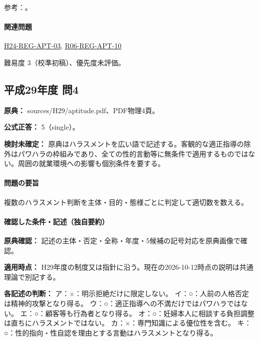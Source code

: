 \par 参考：\cite{employment_power2012,employment_power_current,employment_sexual_current,employment_sexual2018}。

\paragraph{関連問題} \hyperref[q:h24-reg-apt-03]{H24-REG-APT-03}, \hyperref[q:r06-reg-apt-10]{R06-REG-APT-10}

\par 難易度 3（校準初稿）、優先度未評価。

\subsection{平成29年度 問4}
\label{q:h29-reg-apt-04}

\noindent\textbf{原典：} sources/H29/aptitude.pdf、PDF物理4頁。

\textbf{公式正答：} 5（single）。

\par\textbf{検討未確定：} 原典はハラスメントを広い語で記述する。客観的な適正指導の除外はパワハラの枠組みであり、全ての性的言動等に無条件で適用するものではない。周囲の就業環境への影響も個別条件を要する。

\paragraph{問題の要旨} 複数のハラスメント判断を主体・目的・態様ごとに判定して適切数を数える。

\paragraph{確認した条件・記述（独自要約）}\mbox{}\par

\noindent\textbf{原典確認：} 記述の主体・否定・全称・年度・5候補の記号対応を原典画像で確認。\par

\noindent\textbf{適用時点：} H29年度の制度又は指針に沿う。現在の2026-10-12時点の説明は共通理論で別記する。\par

\noindent\textbf{各記述の判断：} ア：×：明示拒絶だけに限定しない。 イ：○：人前の人格否定は精神的攻撃となり得る。 ウ：○：適正指導への不満だけではパワハラではない。 エ：○：顧客等も行為者となり得る。 オ：○：妊婦本人に相談する負担調整は直ちにハラスメントではない。 カ：×：専門知識による優位性を含む。 キ：○：性的指向・性自認を理由とする言動はハラスメントとなり得る。\par

